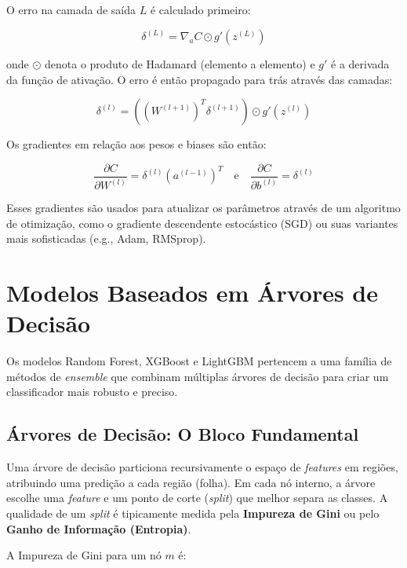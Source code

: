 \documentclass[12pt, a4paper, oneside]{report}
\begin{document}
O erro na camada de saída $L$ é calculado primeiro:

\begin{equation}
    \delta^{(L)} = \nabla_a C \odot g'(z^{(L)})
\end{equation}

onde $\odot$ denota o produto de Hadamard (elemento a elemento) e $g'$ é a derivada da função de ativação. O erro é então propagado para trás através das camadas:

\begin{equation}
    \delta^{(l)} = ((W^{(l+1)})^T \delta^{(l+1)}) \odot g'(z^{(l)})
\end{equation}

Os gradientes em relação aos pesos e biases são então:

\begin{equation}
    \frac{\partial C}{\partial W^{(l)}} = \delta^{(l)} (a^{(l-1)})^T \quad \text{e} \quad \frac{\partial C}{\partial b^{(l)}} = \delta^{(l)}
\end{equation}

Esses gradientes são usados para atualizar os parâmetros através de um algoritmo de otimização, como o gradiente descendente estocástico (SGD) ou suas variantes mais sofisticadas (e.g., Adam, RMSprop).

\section{Modelos Baseados em Árvores de Decisão}

Os modelos Random Forest, XGBoost e LightGBM pertencem a uma família de métodos de \textit{ensemble} que combinam múltiplas árvores de decisão para criar um classificador mais robusto e preciso.

\subsection{Árvores de Decisão: O Bloco Fundamental}

Uma árvore de decisão particiona recursivamente o espaço de \textit{features} em regiões, atribuindo uma predição a cada região (folha). Em cada nó interno, a árvore escolhe uma \textit{feature} e um ponto de corte (\textit{split}) que melhor separa as classes. A qualidade de um \textit{split} é tipicamente medida pela \textbf{Impureza de Gini} ou pelo \textbf{Ganho de Informação (Entropia)}.

A Impureza de Gini para um nó $m$ é:
\end{document}
